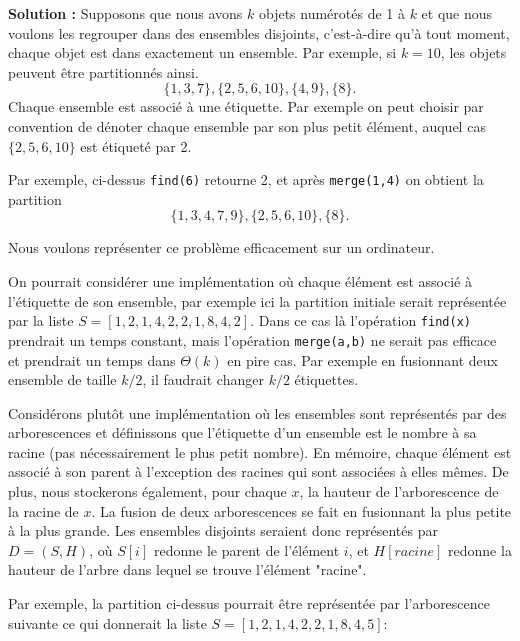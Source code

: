 \documentclass[11pt]{article} %
\newenvironment{solution}[1][\unskip]{%
	\par
	\noindent
	\textbf{Solution #1:}
	\noindent}
{\medskip}
\begin{document}
	\begin{solution}
		Supposons que nous avons $k$ objets numérotés de 1 à $k$ et que nous voulons les regrouper dans des ensembles disjoints, c'est-à-dire qu'à tout moment, chaque objet est dans exactement un ensemble. Par exemple, si $k=10$, les objets peuvent être partitionnés ainsi.
		$$\{1,3,7\}, \{2,5,6,10\},  \{4,9\}, \{8\}.$$
		Chaque ensemble est associé à une étiquette. Par exemple on peut choisir par convention de dénoter chaque ensemble par son plus petit élément, auquel cas $\{2,5,6,10\}$ est étiqueté par 2.
		
		Par exemple, ci-dessus \verb|find(6)| retourne 2, et après \verb|merge(1,4)| on obtient la partition $$\{1,3,4,7,9\}, \{2,5,6,10\}, \{8\}.$$
		
		Nous voulons représenter ce problème efficacement sur un ordinateur. 
		
		On pourrait considérer une implémentation où chaque élément est associé à l'étiquette de son ensemble, par exemple ici la partition initiale serait représentée par la liste $S=[1,2,1,4,2,2,1,8,4,2]$. Dans ce cas là l'opération \verb|find(x)| prendrait un temps constant, mais l'opération \verb|merge(a,b)| ne serait pas efficace et prendrait un temps dans $\Theta(k)$ en pire cas. Par exemple en fusionnant deux ensemble de taille $k/2$, il faudrait changer $k/2$ étiquettes.
		
		Considérons plutôt une implémentation où les ensembles sont représentés par des arborescences et définissons que l'étiquette d'un ensemble est le nombre à sa racine (pas nécessairement le plus petit nombre). En mémoire, chaque élément est associé à son parent à l'exception des racines qui sont associées à elles mêmes. De plus, nous stockerons également, pour chaque $x$, la hauteur de l'arborescence de la racine de $x$. La fusion de deux arborescences se fait en fusionnant la plus petite à la plus grande. Les ensembles disjoints seraient donc représentés par $D=(S,H)$, où $S[i]$ redonne le parent de l'élément $i$, et $H[racine]$ redonne la hauteur de l'arbre dans lequel se trouve l'élément "racine".
		
		Par exemple, la partition ci-dessus pourrait être représentée par l'arborescence suivante ce qui donnerait la liste $S=[1,2,1,4,2,2,1,8,4,5]$:
		
		

\end{solution}
\end{document}
